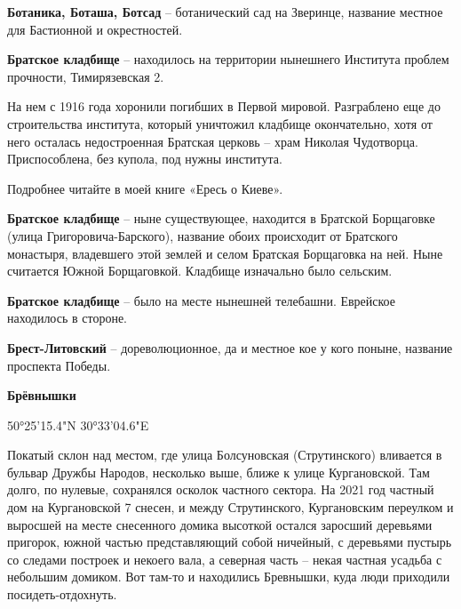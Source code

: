 \medskip

\textbf{Ботаника, Боташа, Ботсад} – ботанический сад на Зверинце, название местное для Бастионной и окрестностей.\\

\medskip


\textbf{Братское кладбище} – находилось на территории нынешнего Института проблем прочности, Тимирязевская 2. 

На нем с 1916 года хоронили погибших в Первой мировой. Разграблено еще до строительства института, который уничтожил кладбище окончательно, хотя от него осталась недостроенная Братская церковь – храм Николая Чудотворца. Приспособлена, без купола, под нужны института.

Подробнее читайте в моей книге «Ересь о Киеве».\\

\medskip

\textbf{Братское кладбище} – ныне существующее, находится в Братской Борщаговке (улица Григо\-ровича-Барского), название обоих происходит от Братского монастыря, владевшего этой землей и селом Братская Борщаговка на ней. Ныне считается Южной Борщаговкой. Кладбище изначально было сельским.\\

\medskip

\textbf{Братское кладбище} – было на месте нынешней телебашни. Еврейское находилось в стороне.\\

\medskip

\textbf{Брест-Литовский} – дореволюционное, да и местное кое у кого поныне, название проспекта Победы.\\

\medskip

\textbf{Брёвнышки}

50°25'15.4"N 30°33'04.6"E

Покатый склон над местом, где улица Болсуновская (Струтинского) вливается в бульвар Дружбы Народов, несколько выше, ближе к улице Кургановской. Там долго, по нулевые, сохранялся осколок частного сектора. На 2021 год частный дом на Кургановской 7 снесен, и между Струтинского, Кургановским переулком и выросшей на месте снесенного домика высоткой остался заросший деревьями пригорок, южной частью представляющий собой ничейный, с деревьями пустырь со следами построек и некоего вала, а северная часть – некая частная усадьба с небольшим домиком. Вот там-то и находились Бревнышки, куда люди приходили посидеть-отдохнуть.

